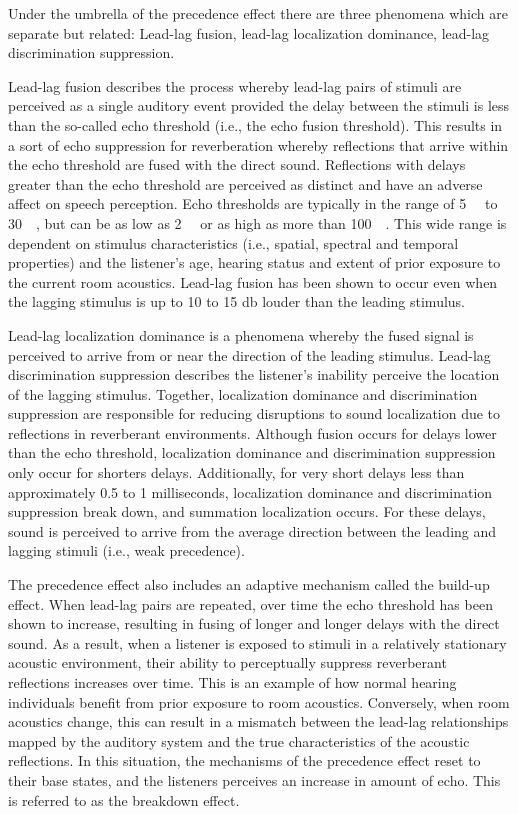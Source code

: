 Under the umbrella of the precedence effect there are three phenomena which are separate but related: Lead-lag fusion, lead-lag localization dominance, lead-lag discrimination suppression. 

Lead-lag fusion describes the process whereby lead-lag pairs of stimuli are perceived as a single auditory event provided the delay between the stimuli is less than the so-called echo threshold (i.e., the echo fusion threshold). This results in a sort of echo suppression for reverberation whereby reflections that arrive within the echo threshold are fused with the direct sound. Reflections with delays greater than the echo threshold are perceived as distinct and have an adverse affect on speech perception. Echo thresholds are typically in the range of \qty{5}{\milli\sec} to \qty{30}{\milli\sec}, but can be as low as \qty{2}{\milli\sec} or as high as more than \qty{100}{\milli\sec}. This wide range is dependent on stimulus characteristics (i.e., spatial, spectral and temporal properties) and the listener's age, hearing status and extent of prior exposure to the current room acoustics. Lead-lag fusion has been shown to occur even when the lagging stimulus is up to 10 to 15 \unit{\decibel} louder than the leading stimulus. 

Lead-lag localization dominance is a phenomena whereby the fused signal is perceived to arrive from or near the direction of the leading stimulus. Lead-lag discrimination suppression describes the listener’s inability perceive the location of the lagging stimulus. Together, localization dominance and discrimination suppression are responsible for reducing disruptions to sound localization due to reflections in reverberant environments. Although fusion occurs for delays lower than the echo threshold, localization dominance and discrimination suppression only occur for shorters delays. Additionally, for very short delays less than approximately 0.5 to 1 milliseconds, localization dominance and discrimination suppression break down, and summation localization occurs. For these delays, sound is perceived to arrive from the average direction between the leading and lagging stimuli (i.e., weak precedence).

The precedence effect also includes an adaptive mechanism called the build-up effect. When lead-lag pairs are repeated, over time the echo threshold has been shown to increase, resulting in fusing of longer and longer delays with the direct sound. As a result, when a listener is exposed to stimuli in a relatively stationary acoustic environment, their ability to perceptually suppress reverberant reflections increases over time. This is an example of how normal hearing individuals benefit from prior exposure to room acoustics. Conversely, when room acoustics change, this can result in a mismatch between the lead-lag relationships mapped by the auditory system and the true characteristics of the acoustic reflections. In this situation, the mechanisms of the precedence effect reset to their base states, and the listeners perceives an increase in amount of echo. This is referred to as the breakdown effect.

